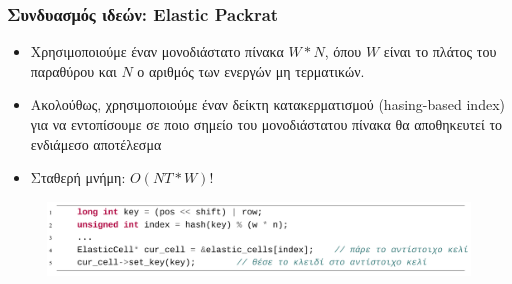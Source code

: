 \documentclass{beamer}
\begin{document}
\begin{frame}
  \frametitle{Συνδυασμός ιδεών: Elastic Packrat}
	\begin{itemize}
	  \item Χρησιμοποιούμε έναν μονοδιάστατο πίνακα $W*N$, όπου $W$ είναι το πλάτος του παραθύρου και $N$ ο αριθμός των ενεργών μη τερματικών.
	  \item Ακολούθως, χρησιμοποιούμε έναν δείκτη κατακερματισμού (hasing-based index) για να εντοπίσουμε σε ποιο σημείο του μονοδιάστατου πίνακα θα αποθηκευτεί το ενδιάμεσο αποτέλεσμα
	  \item<2-> Σταθερή μνήμη: $O(NT * W)$!
	\end{itemize}

\begin{figure}[h]
    \centering
	\includegraphics[width=1.10\textwidth]{pics/hash}
\end{figure} 

\end{frame}
\end{document}
